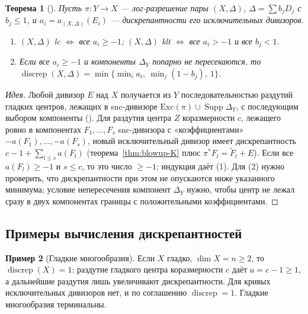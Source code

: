 \documentclass[11pt,a4paper]{article}
\theoremstyle{plain}
\newtheorem{theorem}{Теорема}[section]
\theoremstyle{definition}
\newtheorem{example}[theorem]{Пример}
\theoremstyle{remark}
\DeclareMathOperator{\discrep}{discrep}
\DeclareMathOperator{\Supp}{Supp}
\begin{document}
\begin{theorem}[{\cite[2.31, 2.32]{KM}}]\label{thm:discrep-one-resolution}
Пусть $\pi\colon Y\to X$ --- лог-разрешение пары $(X,\Delta)$, $\Delta=\sum b_jD_j$ с $b_j\le1$, и
$a_i=a_{(X,\Delta)}(E_i)$ --- дискрепантности его исключительных дивизоров.
\begin{enumerate}
\item $(X,\Delta)$ lc $\iff$ все $a_i\ge-1$; $(X,\Delta)$ klt $\iff$ все $a_i>-1$ и все $b_j<1$.
\item Если все $a_i\ge-1$ и компоненты $\Delta_Y$ попарно не пересекаются, то
$\discrep(X,\Delta)=\min\{\min_ia_i,\ \min_j(1-b_j),\ 1\}$.
\end{enumerate}
\end{theorem}
\begin{proof}[Идея]
Любой дивизор $E$ над $X$ получается из $Y$ последовательностью раздутий гладких центров,
лежащих в snc-дивизоре $\mathrm{Exc}(\pi)\cup\Supp\Delta_Y$, с последующим выбором компоненты
(\cite[2.45]{KM}). Для раздутия центра $Z$ коразмерности $c$, лежащего ровно в компонентах
$F_1,\dots,F_s$ snc-дивизора с «коэффициентами» $-a(F_1),\dots,-a(F_s)$, новый исключительный
дивизор имеет дискрепантность $c-1+\sum_{l\le s}a(F_l)$ (теорема~\ref{thm:blowup-K} плюс
$\pi^*F_l=\tilde F_l+E$). Если все $a(F_l)\ge-1$ и $s\le c$, то это число $\ge-1$; индукция даёт (1).
Для (2) нужно проверить, что дискрепантности при этом не опускаются ниже указанного минимума;
условие непересечения компонент $\Delta_Y$ нужно, чтобы центр не лежал сразу в двух компонентах
границы с положительными коэффициентами.
\end{proof}

\subsection{Примеры вычисления дискрепантностей}

\begin{example}[Гладкие многообразия]
Если $X$ гладко, $\dim X=n\ge2$, то $\discrep(X)=1$: раздутие гладкого центра коразмерности $c$
даёт $a=c-1\ge1$, а дальнейшие раздутия лишь увеличивают дискрепантности. Для кривых исключительных
дивизоров нет, и по соглашению $\discrep=1$. Гладкие многообразия терминальны.
\end{example}
\end{document}
